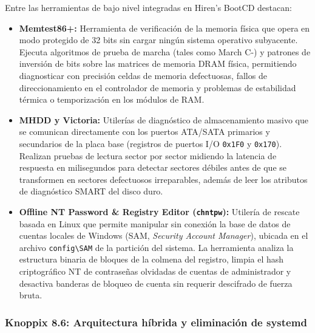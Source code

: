 \documentclass[12pt]{article}
\begin{document}
Entre las herramientas de bajo nivel integradas en Hiren's BootCD destacan:
\begin{itemize}[noitemsep, topsep=2pt]
    \item \textbf{Memtest86+:} Herramienta de verificación de la memoria física que opera en modo protegido de 32 bits sin cargar ningún sistema operativo subyacente. Ejecuta algoritmos de prueba de marcha (tales como March C-) y patrones de inversión de bits sobre las matrices de memoria DRAM física, permitiendo diagnosticar con precisión celdas de memoria defectuosas, fallos de direccionamiento en el controlador de memoria y problemas de estabilidad térmica o temporización en los módulos de RAM.
    \item \textbf{MHDD y Victoria:} Utilerías de diagnóstico de almacenamiento masivo que se comunican directamente con los puertos ATA/SATA primarios y secundarios de la placa base (registros de puertos I/O \texttt{0x1F0} y \texttt{0x170}). Realizan pruebas de lectura sector por sector midiendo la latencia de respuesta en milisegundos para detectar sectores débiles antes de que se transformen en sectores defectuosos irreparables, además de leer los atributos de diagnóstico SMART del disco duro.
    \item \textbf{Offline NT Password \& Registry Editor (\texttt{chntpw}):} Utilería de rescate basada en Linux que permite manipular sin conexión la base de datos de cuentas locales de Windows (SAM, \textit{Security Account Manager}), ubicada en el archivo \texttt{config\textbackslash SAM} de la partición del sistema. La herramienta analiza la estructura binaria de bloques de la colmena del registro, limpia el hash criptográfico NT de contraseñas olvidadas de cuentas de administrador y desactiva banderas de bloqueo de cuenta sin requerir descifrado de fuerza bruta.
\end{itemize}

\subsubsection{Knoppix 8.6: Arquitectura híbrida y eliminación de systemd}
\end{document}
